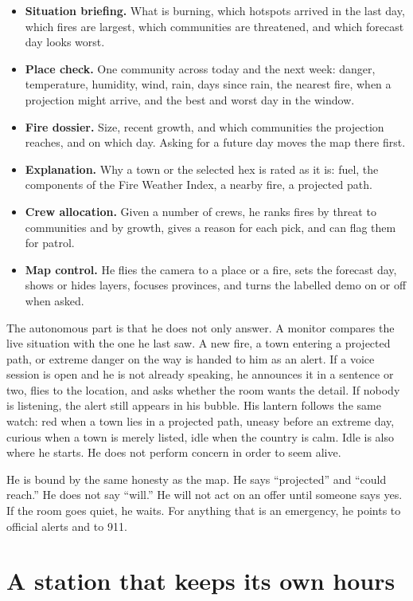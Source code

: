 \documentclass[11pt,a4paper]{article}
\begin{document}
\begin{itemize}
  \item \textbf{Situation briefing.} What is burning, which hotspots arrived in the last day, which fires are largest, which communities are threatened, and which forecast day looks worst.
  \item \textbf{Place check.} One community across today and the next week: danger, temperature, humidity, wind, rain, days since rain, the nearest fire, when a projection might arrive, and the best and worst day in the window.
  \item \textbf{Fire dossier.} Size, recent growth, and which communities the projection reaches, and on which day. Asking for a future day moves the map there first.
  \item \textbf{Explanation.} Why a town or the selected hex is rated as it is: fuel, the components of the Fire Weather Index, a nearby fire, a projected path.
  \item \textbf{Crew allocation.} Given a number of crews, he ranks fires by threat to communities and by growth, gives a reason for each pick, and can flag them for patrol.
  \item \textbf{Map control.} He flies the camera to a place or a fire, sets the forecast day, shows or hides layers, focuses provinces, and turns the labelled demo on or off when asked.
\end{itemize}

The autonomous part is that he does not only answer. A monitor compares the live situation with the one he last saw. A new fire, a town entering a projected path, or extreme danger on the way is handed to him as an alert. If a voice session is open and he is not already speaking, he announces it in a sentence or two, flies to the location, and asks whether the room wants the detail. If nobody is listening, the alert still appears in his bubble. His lantern follows the same watch: red when a town lies in a projected path, uneasy before an extreme day, curious when a town is merely listed, idle when the country is calm. Idle is also where he starts. He does not perform concern in order to seem alive.

He is bound by the same honesty as the map. He says ``projected'' and ``could reach.'' He does not say ``will.'' He will not act on an offer until someone says yes. If the room goes quiet, he waits. For anything that is an emergency, he points to official alerts and to 911.

\section{A station that keeps its own hours}
\end{document}
